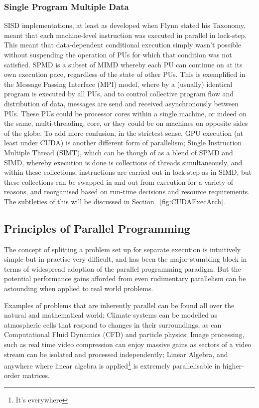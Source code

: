 \subsubsection{Single Program Multiple Data}
SISD implementations, at least as developed when Flynn stated his Taxonomy, meant that each machine-level instruction was executed in parallel in lock-step. This meant that data-dependent conditional execution simply wasn't possible without suspending the operation of PUs for which that condition was not satisfied.
SPMD is a subset of MIMD whereby each PU can continue on at its own execution pace, regardless of the state of other PUs. This is exemplified in the Message Passing Interface (MPI) model, where by a (usually) identical program is executed by all PUs, and to control collective program flow and distribution of data, messages are send and received asynchronously between PUs. These PUs could be processor cores within a single machine, or indeed on the same, multi-threading, core, or they could be on machines on opposite sides of the globe.
To add more confusion, in the strictest sense, GPU execution (at least under CUDA) is another different form of parallelism; Single Instruction Multiple Thread (SIMT), which can be though of as a blend of SPMD and SIMD, whereby execution is done is collections of threads simultaneously, and within these collections, instructions are carried out in lock-step as in SIMD, but these collections can be swapped in and out from execution for a variety of reasons, and reorganised based on run-time decisions and resource requirements. The subtleties of this will be discussed in Section ~\ref{fig:CUDAExecArch}.

\subsection{Principles of Parallel Programming}
The concept of splitting a problem set up for separate execution is intuitively simple but in practise very difficult, and has been the major stumbling block in terms of widespread adoption of the parallel programming paradigm. But the potential performance gains afforded from even rudimentary parallelism can be astounding when applied to real world problems.

Examples of problems that are inherently parallel can be found all over the natural and mathematical world; Climate systems can be modelled as atmospheric cells that respond to changes in their surroundings, as can Computational Fluid Dynamics (CFD) and particle physics; Image processing, such as real time video compression can enjoy massive gains as sectors of a video stream can be isolated and processed independently; Linear Algebra, and anywhere where linear algebra is applied\footnote{It's everywhere} is extremely parallelisable in higher-order matrices.

